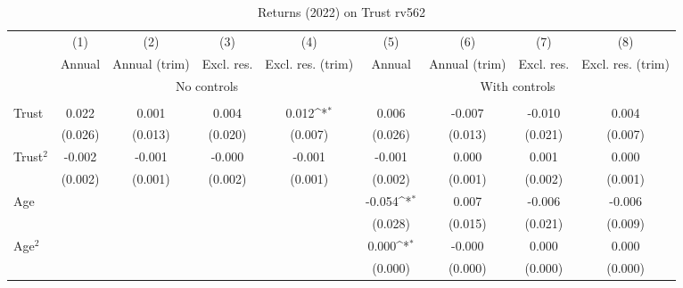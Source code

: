 \begin{table}[htbp]\centering
\def\sym#1{\ifmmode^{#1}\else\(^{#1}\)\fi}
\caption{Returns (2022) on Trust rv562}
\begin{tabular}{l*{8}{c}}
\toprule
          &\multicolumn{1}{c}{(1)}&\multicolumn{1}{c}{(2)}&\multicolumn{1}{c}{(3)}&\multicolumn{1}{c}{(4)}&\multicolumn{1}{c}{(5)}&\multicolumn{1}{c}{(6)}&\multicolumn{1}{c}{(7)}&\multicolumn{1}{c}{(8)}\\
          &\multicolumn{1}{c}{Annual}&\multicolumn{1}{c}{Annual (trim)}&\multicolumn{1}{c}{Excl. res.}&\multicolumn{1}{c}{Excl. res. (trim)}&\multicolumn{1}{c}{Annual}&\multicolumn{1}{c}{Annual (trim)}&\multicolumn{1}{c}{Excl. res.}&\multicolumn{1}{c}{Excl. res. (trim)}\\
& \multicolumn{4}{c}{No controls} & \multicolumn{4}{c}{With controls} \\\\ \cmidrule(lr){2-5}\cmidrule(lr){6-9}
Trust     &    0.022         &    0.001         &    0.004         &    0.012\sym{*}  &    0.006         &   -0.007         &   -0.010         &    0.004         \\
          &  (0.026)         &  (0.013)         &  (0.020)         &  (0.007)         &  (0.026)         &  (0.013)         &  (0.021)         &  (0.007)         \\
Trust$^{2}$&   -0.002         &   -0.001         &   -0.000         &   -0.001         &   -0.001         &    0.000         &    0.001         &    0.000         \\
          &  (0.002)         &  (0.001)         &  (0.002)         &  (0.001)         &  (0.002)         &  (0.001)         &  (0.002)         &  (0.001)         \\
Age       &                  &                  &                  &                  &   -0.054\sym{*}  &    0.007         &   -0.006         &   -0.006         \\
          &                  &                  &                  &                  &  (0.028)         &  (0.015)         &  (0.021)         &  (0.009)         \\
Age$^{2}$ &                  &                  &                  &                  &    0.000\sym{*}  &   -0.000         &    0.000         &    0.000         \\
          &                  &                  &                  &                  &  (0.000)         &  (0.000)         &  (0.000)         &  (0.000)         \\

\end{tabular}
\end{table}
